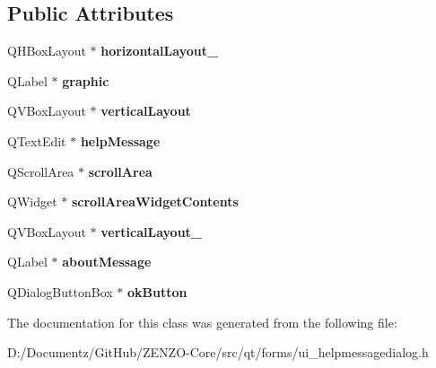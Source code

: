 \subsection*{Public Attributes}
\begin{DoxyCompactItemize}
\item 
\mbox{\label{class_ui___help_message_dialog_ae7953f23ba7ead13a2a7e5af9b6d7288}} 
Q\+H\+Box\+Layout $\ast$ {\bfseries horizontal\+Layout\+\_}
\item 
\mbox{\label{class_ui___help_message_dialog_a7a523bc7b084900101cc95f202232b6e}} 
Q\+Label $\ast$ {\bfseries graphic}
\item 
\mbox{\label{class_ui___help_message_dialog_ad57c4e23aaf6a29083b6157842ce7725}} 
Q\+V\+Box\+Layout $\ast$ {\bfseries vertical\+Layout}
\item 
\mbox{\label{class_ui___help_message_dialog_ac01ca9dcb1a0e768c8f31dcc13acbf17}} 
Q\+Text\+Edit $\ast$ {\bfseries help\+Message}
\item 
\mbox{\label{class_ui___help_message_dialog_a8b2480c933e9cacb94a32e945e12c777}} 
Q\+Scroll\+Area $\ast$ {\bfseries scroll\+Area}
\item 
\mbox{\label{class_ui___help_message_dialog_a4483a963bbc8b3da9cbf500a107b1a70}} 
Q\+Widget $\ast$ {\bfseries scroll\+Area\+Widget\+Contents}
\item 
\mbox{\label{class_ui___help_message_dialog_a6e41b3cc5fa043f9afacc3963edf263f}} 
Q\+V\+Box\+Layout $\ast$ {\bfseries vertical\+Layout\+\_}
\item 
\mbox{\label{class_ui___help_message_dialog_a34a17f2901a70eca9e84efd686711860}} 
Q\+Label $\ast$ {\bfseries about\+Message}
\item 
\mbox{\label{class_ui___help_message_dialog_a5955037d0748f1e83709f3784ee13ffa}} 
Q\+Dialog\+Button\+Box $\ast$ {\bfseries ok\+Button}
\end{DoxyCompactItemize}


The documentation for this class was generated from the following file\+:\begin{DoxyCompactItemize}
\item 
D\+:/\+Documentz/\+Git\+Hub/\+Z\+E\+N\+Z\+O-\/\+Core/src/qt/forms/ui\+\_\+helpmessagedialog.\+h\end{DoxyCompactItemize}
